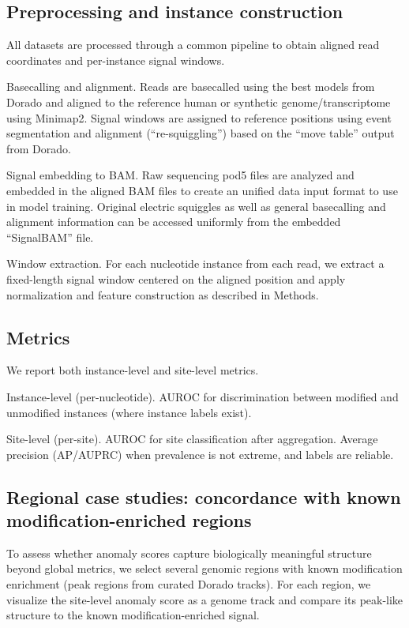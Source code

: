 \documentclass[sigconf, review]{acmart}
\begin{document}
\subsection{Preprocessing and instance construction}
All datasets are processed through a common pipeline to obtain aligned read coordinates and per-instance signal windows.

Basecalling and alignment. Reads are basecalled using the best models from Dorado and aligned to the reference human or synthetic genome/transcriptome using Minimap2. Signal windows are assigned to reference positions using event segmentation and alignment (“re-squiggling”) based on the “move table” output from Dorado.

Signal embedding to BAM. Raw sequencing pod5 files are analyzed and embedded in the aligned BAM files to create an unified data input format to use in model training. Original electric squiggles as well as general basecalling and alignment information can be accessed uniformly from the embedded “SignalBAM” file.

Window extraction. For each nucleotide instance from each read, we extract a fixed-length signal window centered on the aligned position and apply normalization and feature construction as described in Methods.

\subsection{Metrics}
We report both instance-level and site-level metrics.

Instance-level (per-nucleotide). AUROC for discrimination between modified and unmodified instances (where instance labels exist).

Site-level (per-site). AUROC for site classification after aggregation. Average precision (AP/AUPRC) when prevalence is not extreme, and labels are reliable.

\subsection{Regional case studies: concordance with known modification-enriched regions}
To assess whether anomaly scores capture biologically meaningful structure beyond global metrics, we select several genomic regions with known modification enrichment (peak regions from curated Dorado tracks). For each region, we visualize the site-level anomaly score  as a genome track and compare its peak-like structure to the known modification-enriched signal.
\end{document}

